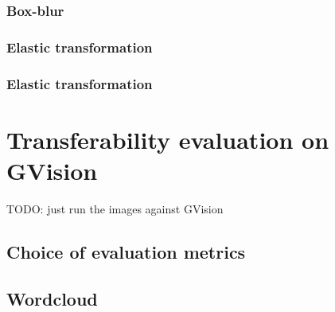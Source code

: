 \subsubsection{Box-blur}
\subsubsection{Elastic transformation}
\subsubsection{Elastic transformation}

\section{Transferability evaluation on GVision}
TODO: just run the images against GVision

\subsection{Choice of evaluation metrics}

\subsection{Wordcloud}
